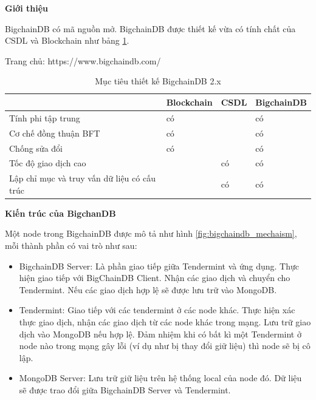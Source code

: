 \textbf{Giới thiệu}

BigchainDB có mã nguồn mở.
BigchainDB được thiết kế vừa có tính chất của CSDL và Blockchain như bảng \ref{table:bigchaindb}.

Trang chủ: https://www.bigchaindb.com/

\begin{table}
\caption{Mục tiêu thiết kế BigchainDB 2.x}
	\label{table:bigchaindb}
	\begin{tabularx} {\textwidth} {|X|p{2.8cm}|p{3cm}|p{2.2cm}|}
\hline
	 & Blockchain & CSDL & BigchainDB \\ \hline
	Tính phi tập trung & có &   & có \\ \hline
	Cơ chế đồng thuận BFT   & có  &   & có \\ \hline
	Chống sửa đổi  & có  &   & có \\ \hline
	Tốc độ giao dịch cao &  & có  & có \\ \hline
	Lập chỉ mục và truy vấn dữ liệu có cấu trúc   &   & có & có \\ \hline
\end{tabularx}
\end{table}

\textbf{Kiến trúc của BigchanDB}

Một node trong BigchainDB được mô tả như hình \ref{fig:bigchaindb_mechaism}, mỗi thành phần có vai trò như sau:

\begin{itemize}
	\item BigchainDB Server: Là phần giao tiếp giữa Tendermint và ứng dụng.
Thực hiện giao tiếp với BigChainDB Client.
Nhận các giao dịch và chuyển cho Tendermint.
Nếu các giao dịch hợp lệ sẽ được lưu trữ vào MongoDB.
	\item Tendermint: Giao tiếp với các tendermint ở các node khác.
Thực hiện xác thực giao dịch, nhận các giao dịch từ các node khác trong mạng.
Lưu trữ giao dịch vào MongoDB nếu hợp lệ.
Đảm nhiệm khi có bất kì một Tendermint ở node nào trong mạng gây lỗi (ví dụ như bị thay đổi giữ liệu) thì node sẽ bị cô lập.
	\item MongoDB Server: Lưu trữ giữ liệu trên hệ thống local của node đó. Dữ liệu sẽ được trao đổi giữa BigchainDB Server và Tendermint.
\end{itemize}


